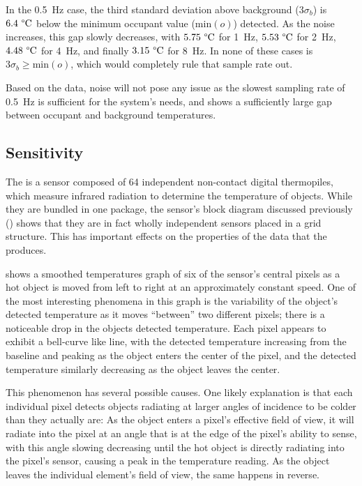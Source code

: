 \documentclass[../thesis/thesis.tex]{subfiles}
\begin{document}
In the 0.5~Hz case, the third standard deviation above background ($3\sigma_b$) is $6.4~\degree\textrm{C}$ below the minimum occupant value ($\mathrm{min}(o)$) detected. As the noise increases, this gap slowly decreases, with $5.75~\degree\textrm{C}$ for 1~Hz, $5.53~\degree\textrm{C}$ for 2~Hz, $4.48~\degree\textrm{C}$ for 4~Hz, and finally $3.15~\degree\textrm{C}$ for 8~Hz. In none of these cases is $3\sigma_b \ge \mathrm{min}(o)$, which would completely rule that sample rate out.

Based on the data, noise will not pose any issue as the slowest sampling rate of 0.5~Hz is sufficient for the system's needs, and shows a sufficiently large gap between occupant and background temperatures.


\subsection{Sensitivity}
\label{subsec:sensitivity}

The \mlx is a sensor composed of 64 independent non-contact digital thermopiles, which measure infrared radiation to determine the temperature of objects. While they are bundled in one package, the sensor's block diagram discussed previously () shows that they are in fact wholly independent sensors placed in a grid structure. This has important effects on the properties of the data that the \mlx produces. 

 shows a smoothed temperatures graph of six of the sensor's central pixels as a hot object is moved from left to right at an approximately constant speed. One of the most interesting phenomena in this graph is the variability of the object's detected temperature as it moves ``between'' two different pixels; there is a noticeable drop in the objects detected temperature. Each pixel appears to exhibit a bell-curve like line, with the detected temperature increasing from the baseline and peaking as the object enters the center of the pixel, and the detected temperature similarly decreasing as the object leaves the center. 

This phenomenon has several possible causes. One likely explanation is that each individual pixel detects objects radiating at larger angles of incidence to be colder than they actually are: As the object enters a pixel's effective field of view, it will radiate into the pixel at an angle that is at the edge of the pixel's ability to sense, with this angle slowing decreasing until the hot object is directly radiating into the pixel's sensor, causing a peak in the temperature reading. As the object leaves the individual element's field of view, the same happens in reverse.
\end{document}
